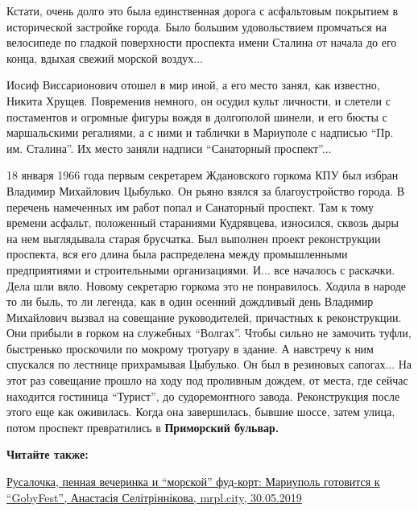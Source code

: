Кстати, очень долго это была единственная дорога с асфальтовым покрытием в
исторической застройке города. Было большим удовольствием промчаться на
велосипеде по гладкой поверхности проспекта имени Сталина от начала до его
конца, вдыхая свежий морской воздух...

Иосиф Виссарионович отошел в мир иной, а его место занял, как известно, Никита
Хрущев. Повременив немного, он осудил культ личности, и слетели с постаментов и
огромные фигуры вождя в долгополой шинели, и его бюсты с маршальскими
регалиями, а с ними и таблички в Мариуполе с надписью \enquote{Пр. им. Сталина}. Их
место заняли надписи \enquote{Санаторный проспект}...

18 января 1966 года первым секретарем Ждановского горкома КПУ был избран
Владимир Михайлович Цыбулько. Он рьяно взялся за благоустройство города. В
перечень намеченных им работ попал и Санаторный проспект. Там к тому времени
асфальт, положенный стараниями Кудрявцева, износился, сквозь дыры на нем
выглядывала старая брусчатка. Был выполнен проект реконструкции проспекта, вся
его длина была распределена между промышленными предприятиями и строительными
организациями. И... все началось с раскачки. Дела шли вяло. Новому секретарю
горкома это не понравилось. Ходила в народе то ли быль, то ли легенда, как в
один осенний дождливый день Владимир Михайлович вызвал на совещание
руководителей, причастных к реконструкции. Они прибыли в горком на служебных
\enquote{Волгах}. Чтобы сильно не замочить туфли, быстренько проскочили по мокрому
тротуару в здание. А навстречу к ним спускался по лестнице прихрамывая
Цыбулько. Он был в резиновых сапогах... На этот раз совещание прошло на ходу под
проливным дождем, от места, где сейчас находится гостиница \enquote{Турист}, до
судоремонтного завода. Реконструкция после этого еще как оживилась. Когда она
завершилась, бывшие шоссе, затем улица, потом проспект превратились в
\textbf{Приморский бульвар.}

\textbf{Читайте также:} 

\href{https://mrpl.city/news/view/rusalochka-pennaya-vecherinka-i-morskoj-fud-kort-mariupol-gotovitsya-k-gobyfest-video}{%
Русалочка, пенная вечеринка и \enquote{морской} фуд-корт: Мариуполь готовится к \enquote{GobyFest}, Анастасія Селітріннікова, mrpl.city, 30.05.2019}
